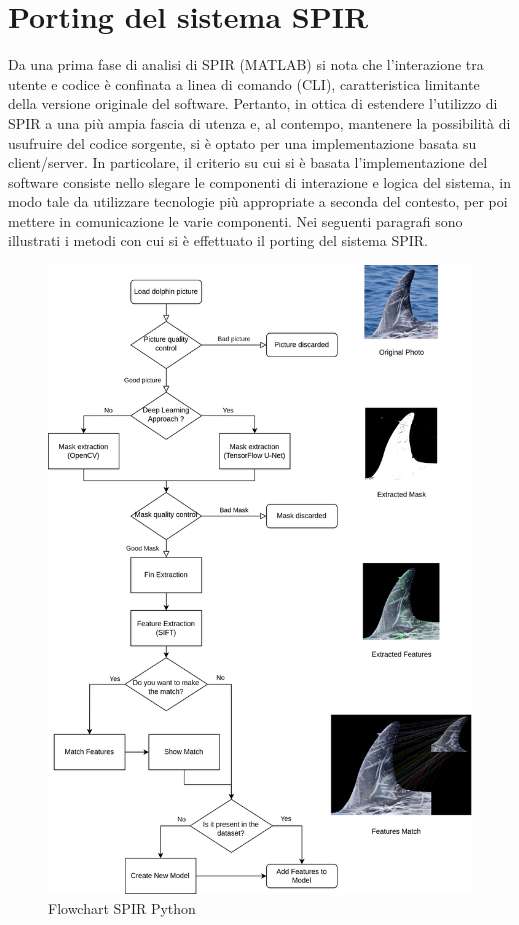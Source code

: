 \documentclass[a4paper,12pt]{report}
\begin{document}
  \section{Porting del sistema SPIR}
  Da una prima fase di analisi di SPIR (MATLAB) si nota che l'interazione tra utente e codice è confinata
  a linea di comando (CLI), caratteristica limitante della versione originale del software. Pertanto, in ottica di estendere l'utilizzo di SPIR a una più ampia
  fascia di utenza e, al contempo, mantenere la possibilità di usufruire del codice sorgente, si è optato per una implementazione basata su client/server.
  In particolare, il criterio su cui si è basata l'implementazione del software consiste nello slegare le componenti di interazione e logica del sistema, in modo tale da utilizzare tecnologie più appropriate a seconda del contesto, per poi mettere in comunicazione le 
  varie componenti. Nei seguenti paragrafi sono illustrati i metodi con cui si è effettuato il porting del sistema SPIR.
  \begin{figure}[H]
    \centering
      \includegraphics[width=\textwidth]{assets/images/methods/porting/porting_digram.png}  
      \caption{Flowchart SPIR Python}
  \end{figure}
\end{document}
